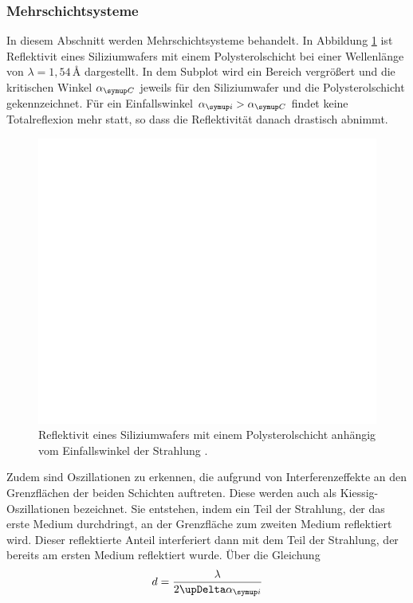 \subsubsection{Mehrschichtsysteme}
In diesem Abschnitt werden Mehrschichtsysteme behandelt. In Abbildung \ref{fig:reflectivity} ist
Reflektivit eines Siliziumwafers mit einem Polysterolschicht bei einer Wellenlänge von $\lambda = 1,54\,\unit{\angstrom}$ dargestellt. 
In dem Subplot wird ein Bereich vergrößert und die kritischen Winkel $\alpha\idx{C}$ jeweils für den Siliziumwafer und die Polysterolschicht gekennzeichnet.
Für ein Einfallswinkel $\alpha\idx{i} > \alpha\idx{C}$ findet keine Totalreflexion mehr statt, so dass die Reflektivität danach drastisch abnimmt.
\begin{figure}[H]
  \centering
  \includegraphics[scale=1.2]{reflectivity_plot.pdf}
  \caption{Reflektivit eines Siliziumwafers mit einem Polysterolschicht anhängig vom Einfallswinkel der Strahlung \cite{tolan}.}
  \label{fig:reflectivity}
\end{figure}
\noindent
Zudem sind Oszillationen zu erkennen, die aufgrund von Interferenzeffekte an den Grenzflächen der beiden Schichten auftreten.
Diese werden auch als Kiessig-Oszillationen bezeichnet. Sie entstehen, indem ein Teil der Strahlung, der das erste Medium durchdringt, 
an der Grenzfläche zum zweiten Medium reflektiert wird. Dieser reflektierte Anteil interferiert dann mit dem Teil der Strahlung, der 
bereits am ersten Medium reflektiert wurde. Über die Gleichung 
\begin{equation}
d = \frac{\lambda}{2\upDelta \alpha\idx{i}}
\label{eq:schicht}
\end{equation}
